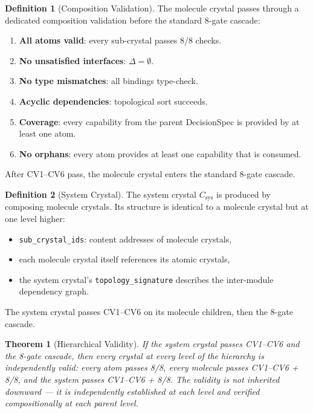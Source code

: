 \documentclass[11pt,a4paper,twoside]{article}
\theoremstyle{definition}
\newtheorem{definition}{Definition}[section]
\theoremstyle{plain}
\newtheorem{theorem}{Theorem}[section]
\theoremstyle{remark}
\begin{document}
\begin{definition}[Composition Validation]\label{def:compval}
The molecule crystal passes through a dedicated composition
validation before the standard 8-gate cascade:
\begin{enumerate}[nosep,label=(CV\arabic*)]
  \item \textbf{All atoms valid}: every sub-crystal passes 8/8 checks.
  \item \textbf{No unsatisfied interfaces}: $\Delta = \emptyset$.
  \item \textbf{No type mismatches}: all bindings type-check.
  \item \textbf{Acyclic dependencies}: topological sort succeeds.
  \item \textbf{Coverage}: every capability from the parent
        DecisionSpec is provided by at least one atom.
  \item \textbf{No orphans}: every atom provides at least one
        capability that is consumed.
\end{enumerate}
After CV1--CV6 pass, the molecule crystal enters the standard
8-gate cascade.
\end{definition}

\begin{definition}[System Crystal]\label{def:syscrystal}
The system crystal $C_{\mathrm{sys}}$ is produced by composing
molecule crystals. Its structure is identical to a molecule crystal
but at one level higher:
\begin{itemize}[nosep]
  \item \texttt{sub\_crystal\_ids}: content addresses of molecule
        crystals,
  \item each molecule crystal itself references its atomic crystals,
  \item the system crystal's \texttt{topology\_signature} describes
        the inter-module dependency graph.
\end{itemize}
The system crystal passes CV1--CV6 on its molecule children, then
the 8-gate cascade.
\end{definition}

\begin{theorem}[Hierarchical Validity]\label{thm:hiervalid}
If the system crystal passes CV1--CV6 and the 8-gate cascade, then
every crystal at every level of the hierarchy is independently valid:
every atom passes 8/8, every molecule passes CV1--CV6 + 8/8, and the
system passes CV1--CV6 + 8/8. The validity is not inherited downward
--- it is independently established at each level and verified
compositionally at each parent level.
\end{theorem}
\end{document}
